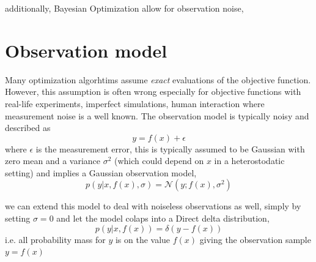 additionally, Bayesian Optimization allow for observation noise, 

\section{Observation model}\label{ObsModel}
Many optimization algorhtims assume \textit{exact} evaluations of the objective function. However, this assumption
is often wrong especially for objective functions with real-life experiments, imperfect simulations, human interaction 
where measurement noise is a well known. The observation model is typically noisy and described as
$$y = f(x)+\epsilon$$ where $\epsilon$ is the measurement error, this is
typically assumed to be Gaussian with zero mean and a variance
$\sigma^2$ (which could depend on $x$ in a heterostodatic setting) and implies a Gaussian observation model, 
$$p(y|x,f(x),\sigma) = \mathcal{N}(y;f(x),\sigma^2)$$ 

we can extend this model to deal with noiseless observations as well, simply by setting $\sigma = 0$ and let the
model colaps into a Direct delta distribution, 
$$p(y|x, f(x)) = \mathcal{\delta}(y-f(x))$$
i.e. all probability mass for $y$ is on the value $f(x)$ giving the observation sample $y = f(x)$


